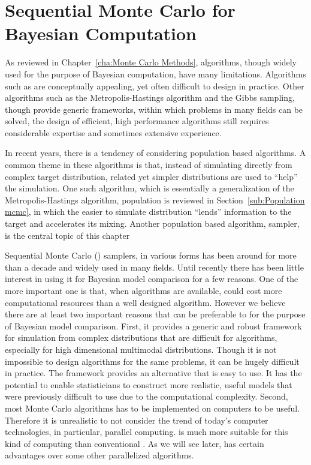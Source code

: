 \chapter{Sequential Monte Carlo for Bayesian Computation}
\label{cha:Sequential Monte Carlo for Bayesian Computation}

As reviewed in Chapter~\ref{cha:Monte Carlo Methods}, \mcmc algorithms, though
widely used for the purpose of Bayesian computation, have many limitations.
Algorithms such as \rjmcmc are conceptually appealing, yet often difficult to
design in practice. Other algorithms such as the Metropolis-Hastings algorithm
and the Gibbs sampling, though provide generic frameworks, within which
problems in many fields can be solved, the design of efficient, high
performance algorithms still requires considerable expertise and sometimes
extensive experience.

In recent years, there is a tendency of considering population based
algorithms. A common theme in these algorithms is that, instead of simulating
directly from complex target distribution, related yet simpler distributions
are used to ``help'' the simulation. One such algorithm, which is essentially
a generalization of the Metropolis-Hastings algorithm, population \mcmc is
reviewed in Section~\ref{sub:Population mcmc}, in which the easier to simulate
distribution ``lends'' information to the target and accelerates its mixing.
Another population based algorithm, \smc sampler, is the central topic of this
chapter

Sequential Monte Carlo (\smc) samplers, in various forms has been around for
more than a decade and widely used in many fields. Until recently there has
been little interest in using it for Bayesian model comparison for a few
reasons. One of the more important one is that, when \mcmc algorithms are
available, \smc could cost more computational resources than a well designed
\mcmc algorithm. However we believe there are at least two important reasons
that \smc can be preferable to \mcmc for the purpose of Bayesian model
comparison. First, it provides a generic and robust framework for simulation
from complex distributions that are difficult for \mcmc algorithms, especially
for high dimensional multimodal distributions. Though it is not impossible to
design \mcmc algorithms for the same problems, it can be hugely difficult in
practice. The \smc framework provides an alternative that is easy to use. It
has the potential to enable statisticians to construct more realistic, useful
models that were previously difficult to use due to the computational
complexity. Second, most Monte Carlo algorithms has to be implemented on
computers to be useful. Therefore it is unrealistic to not consider the trend
of today's computer technologies, in particular, parallel computing. \smc is
much more suitable for this kind of computing than conventional \mcmc. As we
will see later, \smc has certain advantages over some other parallelized
algorithms.

